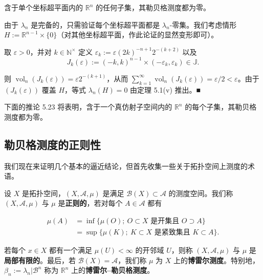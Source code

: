 \begin{example}

含于单个坐标超平面内的 $ \mathbb{R}^n $ 的任何子集，其勒贝格测度都为零。

\proofhead
由于 $ \lambda_n $ 是完备的，只需验证每个坐标超平面都是 $ \lambda_n $-零集。我们考虑情形 $ H := \mathbb{R}^{n-1} \times \{0\} $（对其他坐标超平面，作此论证的显然变形即可）。

取 $ \varepsilon > 0 $，并对 $ k \in \mathbb{N}^{\times} $ 定义 $ \varepsilon_k := \varepsilon(2k)^{-n+1}2^{-(k+2)} $ 以及
\[
J_k(\varepsilon) := (-k, k)^{n-1} \times (-\varepsilon_k, \varepsilon_k) \in \mathbb{J} .
\]

则 $ \operatorname{vol}_n(J_k(\varepsilon)) = \varepsilon 2^{-(k+1)} $，从而 $ \sum_{k=1}^{\infty} \operatorname{vol}_n(J_k(\varepsilon)) = \varepsilon/2 < \varepsilon $。由于 $ (J_k(\varepsilon)) $ 覆盖 $ H $，等式 $ \lambda_n(H) = 0 $ 由定理 5.1(v) 推出。\nobreak\hspace{0.35em}■

下面的推论 5.23 将表明，含于一个真仿射子空间内的 $ \mathbb{R}^n $ 的每个子集，其勒贝格测度都为零。

\end{example}

\subsection*{勒贝格测度的正则性}

我们现在来证明几个基本的逼近结论，但首先收集一些关于拓扑空间上测度的术语。

设 $ X $ 是拓扑空间，$ (X, \mathcal{A}, \mu) $ 是满足 $ \mathcal{B}(X) \subset \mathcal{A} $ 的测度空间。我们称 $ (X, \mathcal{A}, \mu) $ 与 $ \mu $ 是\textbf{正则的}，若对每个 $ A \in \mathcal{A} $ 都有

\begin{equation*}
\begin{aligned}
\mu(A) &= \inf \{ \mu(O) ; \ O \subset X \text{ 是开集且 } O \supset A \} \\ &= \sup \{ \mu(K) ; \ K \subset X \text{ 是紧致集且 } K \subset A \} .
\end{aligned}
\end{equation*}

若每个 $ x \in X $ 都有一个满足 $ \mu(U) < \infty $ 的开邻域 $ U $，则称 $ (X, \mathcal{A}, \mu) $ 与 $ \mu $ 是\textbf{局部有限的}。最后，若 $ \mathcal{B}(X) = \mathcal{A} $，我们称 $ \mu $ 为 $ X $ 上的\textbf{博雷尔测度}。特别地，$ \beta_n := \lambda_n|\mathcal{B}^n $ 称为 $ \mathbb{R}^n $ 上的\textbf{博雷尔–勒贝格测度}。

